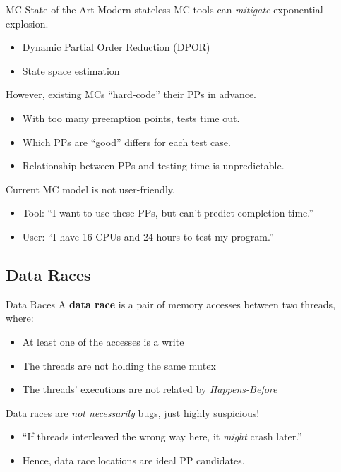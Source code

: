 \documentclass[xcolor=dvipsnames]{beamer}
\begin{document}
\begin{frame}{MC State of the Art}
	Modern stateless MC tools can {\em mitigate} exponential explosion.
	\begin{itemize}
		\item Dynamic Partial Order Reduction (DPOR)
		\item State space estimation
	\end{itemize}
	\linegap

	However, existing MCs ``hard-code'' their PPs in advance.
	\begin{itemize}
		\item With too many preemption points, tests time out.
		\item Which PPs are ``good'' differs for each test case.
		\item Relationship between PPs and testing time is unpredictable.
	\end{itemize}
	\linegap

	Current MC model is not user-friendly.
	\begin{itemize}
		\item Tool: ``I want to use these PPs, but can't predict completion time.''
		\item User: ``I have 16 CPUs and 24 hours to test my program.''
	\end{itemize}
\end{frame}


\subsection{Data Races}

\begin{frame}{Data Races}
	A {\bf data race} is a pair of memory accesses between two threads, where:
	\begin{itemize}
		\item At least one of the accesses is a write
		\item The threads are not holding the same mutex
		\item The threads' executions are not related by {\em Happens-Before}
	\end{itemize}

	Data races are {\em not necessarily} bugs, just highly suspicious!
	\begin{itemize}
		\item ``If threads interleaved the wrong way here, it {\em might} crash later.''
		\item Hence, data race locations are ideal PP candidates.
	\end{itemize}
\end{frame}
\end{document}
